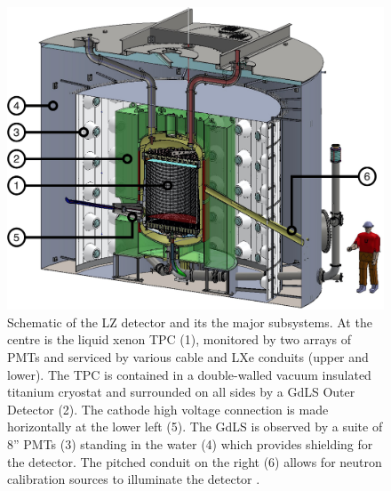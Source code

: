\begin{figure}[!ht]
    \centering
    \includegraphics[width=0.7\linewidth]{figures/LZ/LZSchematic.pdf}
    \caption[Schematic of the LZ detector and its the major subsystems.]{Schematic of the LZ detector and its the major subsystems. At the centre is the liquid xenon TPC (1), monitored by two arrays of PMTs and serviced by various cable and LXe conduits (upper and lower). The TPC is contained in a double-walled vacuum insulated titanium cryostat and surrounded on all sides by a GdLS Outer Detector (2). The cathode high voltage connection is made horizontally at the lower left (5). The GdLS is observed by a suite of 8” PMTs (3) standing in the water (4) which provides shielding for the detector. The pitched conduit on the right (6) allows for neutron calibration sources to illuminate the detector \cite{LZNIMA}.}
    \label{fig:LZ/LZDetector}
\end{figure}
